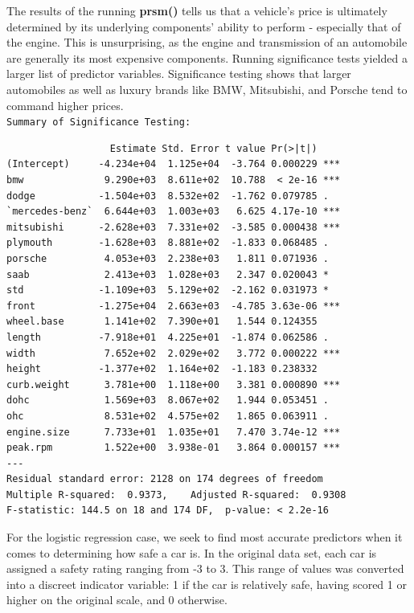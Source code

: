 \documentclass[letter]{article}
\begin{document}
  The results of the running \textbf{prsm()} tells us that a vehicle's price is ultimately determined by its underlying components' ability to perform - especially that of the engine.  This is unsurprising, as the engine and transmission of an automobile are generally its most expensive components.  Running significance tests yielded a larger list of predictor variables. Significance testing shows that larger automobiles as well as luxury brands like BMW, Mitsubishi, and Porsche tend to command higher prices.\\
\texttt{Summary of Significance Testing:}\\
\begin{verbatim}
                  Estimate Std. Error t value Pr(>|t|)    
(Intercept)     -4.234e+04  1.125e+04  -3.764 0.000229 ***
bmw              9.290e+03  8.611e+02  10.788  < 2e-16 ***
dodge           -1.504e+03  8.532e+02  -1.762 0.079785 .  
`mercedes-benz`  6.644e+03  1.003e+03   6.625 4.17e-10 ***
mitsubishi      -2.628e+03  7.331e+02  -3.585 0.000438 ***
plymouth        -1.628e+03  8.881e+02  -1.833 0.068485 .  
porsche          4.053e+03  2.238e+03   1.811 0.071936 .  
saab             2.413e+03  1.028e+03   2.347 0.020043 *  
std             -1.109e+03  5.129e+02  -2.162 0.031973 *  
front           -1.275e+04  2.663e+03  -4.785 3.63e-06 ***
wheel.base       1.141e+02  7.390e+01   1.544 0.124355    
length          -7.918e+01  4.225e+01  -1.874 0.062586 .  
width            7.652e+02  2.029e+02   3.772 0.000222 ***
height          -1.377e+02  1.164e+02  -1.183 0.238332    
curb.weight      3.781e+00  1.118e+00   3.381 0.000890 ***
dohc             1.569e+03  8.067e+02   1.944 0.053451 .  
ohc              8.531e+02  4.575e+02   1.865 0.063911 .  
engine.size      7.733e+01  1.035e+01   7.470 3.74e-12 ***
peak.rpm         1.522e+00  3.938e-01   3.864 0.000157 ***
---
Residual standard error: 2128 on 174 degrees of freedom
Multiple R-squared:  0.9373,	Adjusted R-squared:  0.9308 
F-statistic: 144.5 on 18 and 174 DF,  p-value: < 2.2e-16  

\end{verbatim}

\newpage


For the logistic regression case, we seek to find most accurate predictors when it comes to determining how safe a car is.  In the original data set, each car is assigned a safety rating ranging from -3 to 3.  This range of values was converted into a discreet indicator variable: 1 if the car is relatively safe, having scored 1 or higher on the original scale, and 0 otherwise.
\end{document}
